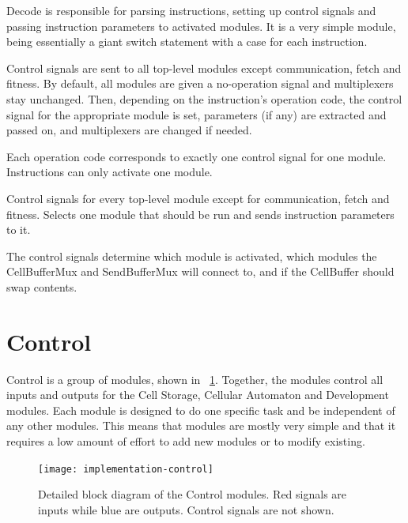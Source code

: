 Decode is responsible for parsing instructions, setting up control signals and passing instruction parameters to activated modules.
It is a very simple module, being essentially a giant switch statement with a case for each instruction.

Control signals are sent to all top-level modules except communication, fetch and fitness.
By default, all modules are given a no-operation signal and multiplexers stay unchanged.
Then, depending on the instruction's operation code, the control signal for the appropriate module is set, parameters (if any) are extracted and passed on, and multiplexers are changed if needed.

Each operation code corresponds to exactly one control signal for one module.
Instructions can only activate one module.

Control signals for every top-level module except for communication, fetch and fitness.
Selects one module that should be run and sends instruction parameters to it.

The control signals determine which module is activated, which modules the CellBufferMux and SendBufferMux will connect to, and if the CellBuffer should swap contents.



\section{Control}

Control is a group of modules, shown in \figurename~\ref{fig:implementation-control}.
Together, the modules control all inputs and outputs for the Cell Storage, Cellular Automaton and Development modules.
Each module is designed to do one specific task and be independent of any other modules.
This means that modules are mostly very simple and that it requires a low amount of effort to add new modules or to modify existing.

\begin{figure}[!ht]
    \centering
    \texttt{[image: implementation-control]}
    \caption[Control modules]{
        Detailed block diagram of the Control modules.
        Red signals are inputs while blue are outputs.
        Control signals are not shown.
    }
    \label{fig:implementation-control}
\end{figure}

